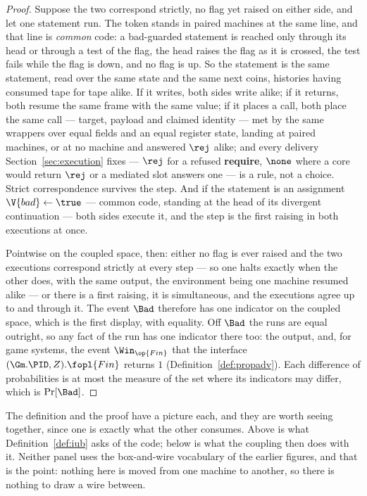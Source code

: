 \documentclass[10pt,oneside,openany]{book}
\theoremstyle{accentdef}
\theoremstyle{accentplain}
\begin{document}
\begin{proof}
Suppose the two correspond strictly, no flag yet raised on either side, and let one statement
run. The token stands in paired machines at the same line, and that line is \emph{common} code:
a bad-guarded statement is reached only through its head or through a test of the flag, the head
raises the flag as it is crossed, the test fails while the flag is down, and no flag is up. So
the statement is the same statement, read over the same state and the same next coins, histories
having consumed tape for tape alike. If it writes, both sides write alike; if it returns, both
resume the same frame with the same value; if it places a call, both place the same call ---
target, payload and claimed identity --- met by the same wrappers over equal fields and an equal
register state, landing at paired machines, or at no machine and answered $\rej$ alike; and
every delivery Section~\ref{sec:execution} fixes --- $\rej$ for a refused \textbf{require},
$\none$ where a core would return $\rej$ or a mediated slot answers one --- is a rule, not a
choice. Strict correspondence survives the step. And if the statement is an assignment
$\V{bad} \gets \true$ --- common code, standing at the head of its divergent continuation
--- both sides execute it, and the step is the first raising in both executions at once.

Pointwise on the coupled space, then: either no flag is ever raised and the two executions
correspond strictly at every step --- so one halts exactly when the other does, with the same
output, the environment being one machine resumed alike --- or there is a first raising, it is
simultaneous, and the executions agree up to and through it. The event $\Bad$ therefore has one
indicator on the coupled space, which is the first display, with equality. Off $\Bad$ the runs
are equal outright, so any fact of the run has one indicator there too: the output, and, for
game systems, the event $\Win_{\op{Fin}}$ that the interface $(\Gm.\PID,Z).\fopl{Fin}$ returns
$1$ (Definition~\ref{def:propadv}). Each difference of probabilities is at most the measure of
the set where its indicators may differ, which is $\Pr[\Bad]$.
\end{proof}

The definition and the proof have a picture each, and they are worth seeing together, since one is
exactly what the other consumes. Above is what Definition~\ref{def:iub} asks of the code; below is
what the coupling then does with it. Neither panel uses the box-and-wire vocabulary of the earlier
figures, and that is the point: nothing here is moved from one machine to another, so there is
nothing to draw a wire between.
\end{document}
